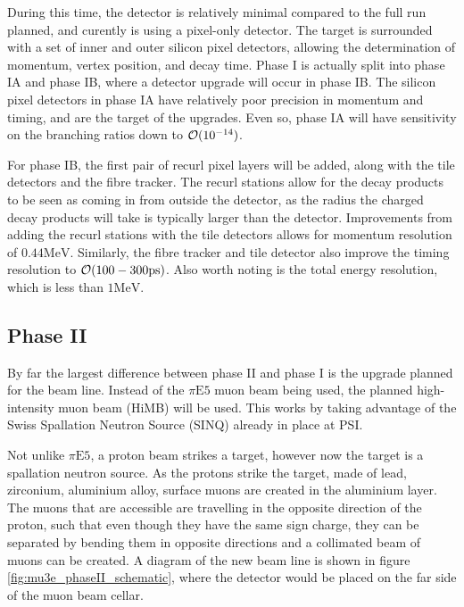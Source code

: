 During this time, the detector is relatively minimal compared to the full run planned, and curently is using a pixel-only detector.
The target is surrounded with a set of inner and outer silicon pixel detectors, allowing the determination of momentum, vertex position, and decay time.
Phase I is actually split into phase IA and phase IB, where a detector upgrade will occur in phase IB\@.
The silicon pixel detectors in phase IA have relatively poor precision in momentum and timing, and are the target of the upgrades.
Even so, phase IA will have sensitivity on the branching ratios down to $\operatorname{\mathcal{O}}(10^{-14})$.

For phase IB, the first pair of recurl pixel layers will be added, along with the tile detectors and the fibre tracker.
The recurl stations allow for the decay products to be seen as coming in from outside the detector, as the radius the charged decay products will take is typically larger than the detector.
Improvements from adding the recurl stations with the tile detectors allows for momentum resolution of $0.44\textrm{MeV}$.
Similarly, the fibre tracker and tile detector also improve the timing resolution to $\operatorname{\mathcal{O}}(100-300\textrm{ps})$. 
Also worth noting is the total energy resolution, which is less than $1\textrm{MeV}$.

\subsection{Phase II}
By far the largest difference between phase II and phase I is the upgrade planned for the beam line.
Instead of the $\pi\textrm{E5}$ muon beam being used, the planned high-intensity muon beam (HiMB) will be used.
This works by taking advantage of the Swiss Spallation Neutron Source (SINQ) already in place at PSI.

Not unlike $\pi\textrm{E5}$, a proton beam strikes a target, however now the target is a spallation neutron source.
As the protons strike the target, made of lead, zirconium, aluminium alloy, surface muons are created in the aluminium layer.
The muons that are accessible are travelling in the opposite direction of the proton, such that even though they have the same sign charge, they can be separated by bending them in opposite directions and a collimated beam of muons can be created.
A diagram of the new beam line is shown in figure \ref{fig:mu3e_phaseII_schematic}, where the \mueee detector would be placed on the far side of the muon beam cellar.


